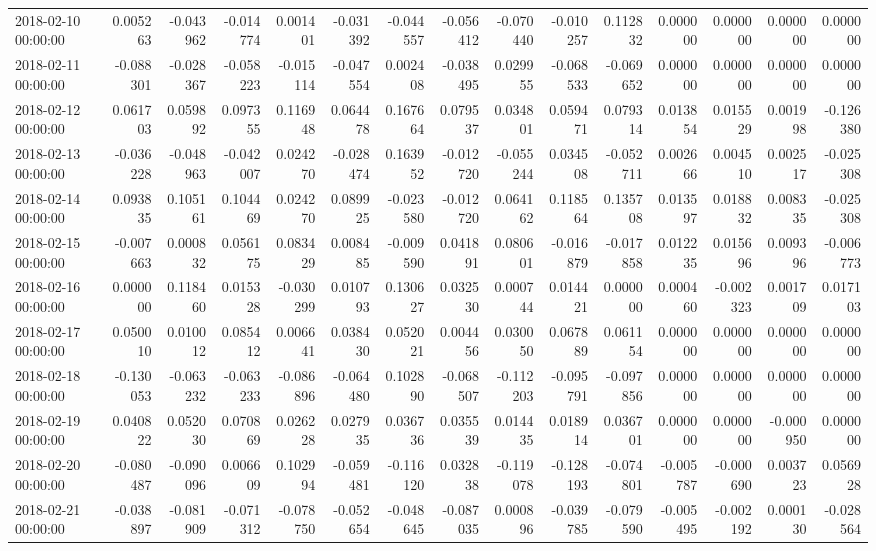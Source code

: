 \begin{tabular}{lrrrrrrrrrrrrrr}
2018-02-10 00:00:00 & 0.005263 & -0.043962 & -0.014774 & 0.001401 & -0.031392 & -0.044557 & -0.056412 & -0.070440 & -0.010257 & 0.112832 & 0.000000 & 0.000000 & 0.000000 & 0.000000 \\
2018-02-11 00:00:00 & -0.088301 & -0.028367 & -0.058223 & -0.015114 & -0.047554 & 0.002408 & -0.038495 & 0.029955 & -0.068533 & -0.069652 & 0.000000 & 0.000000 & 0.000000 & 0.000000 \\
2018-02-12 00:00:00 & 0.061703 & 0.059892 & 0.097355 & 0.116948 & 0.064478 & 0.167664 & 0.079537 & 0.034801 & 0.059471 & 0.079314 & 0.013854 & 0.015529 & 0.001998 & -0.126380 \\
2018-02-13 00:00:00 & -0.036228 & -0.048963 & -0.042007 & 0.024270 & -0.028474 & 0.163952 & -0.012720 & -0.055244 & 0.034508 & -0.052711 & 0.002666 & 0.004510 & 0.002517 & -0.025308 \\
2018-02-14 00:00:00 & 0.093835 & 0.105161 & 0.104469 & 0.024270 & 0.089925 & -0.023580 & -0.012720 & 0.064162 & 0.118564 & 0.135708 & 0.013597 & 0.018832 & 0.008335 & -0.025308 \\
2018-02-15 00:00:00 & -0.007663 & 0.000832 & 0.056175 & 0.083429 & 0.008485 & -0.009590 & 0.041891 & 0.080601 & -0.016879 & -0.017858 & 0.012235 & 0.015696 & 0.009396 & -0.006773 \\
2018-02-16 00:00:00 & 0.000000 & 0.118460 & 0.015328 & -0.030299 & 0.010793 & 0.130627 & 0.032530 & 0.000744 & 0.014421 & 0.000000 & 0.000460 & -0.002323 & 0.001709 & 0.017103 \\
2018-02-17 00:00:00 & 0.050010 & 0.010012 & 0.085412 & 0.006641 & 0.038430 & 0.052021 & 0.004456 & 0.030050 & 0.067889 & 0.061154 & 0.000000 & 0.000000 & 0.000000 & 0.000000 \\
2018-02-18 00:00:00 & -0.130053 & -0.063232 & -0.063233 & -0.086896 & -0.064480 & 0.102890 & -0.068507 & -0.112203 & -0.095791 & -0.097856 & 0.000000 & 0.000000 & 0.000000 & 0.000000 \\
2018-02-19 00:00:00 & 0.040822 & 0.052030 & 0.070869 & 0.026228 & 0.027935 & 0.036736 & 0.035539 & 0.014435 & 0.018914 & 0.036701 & 0.000000 & 0.000000 & -0.000950 & 0.000000 \\
2018-02-20 00:00:00 & -0.080487 & -0.090096 & 0.006609 & 0.102994 & -0.059481 & -0.116120 & 0.032838 & -0.119078 & -0.128193 & -0.074801 & -0.005787 & -0.000690 & 0.003723 & 0.056928 \\
2018-02-21 00:00:00 & -0.038897 & -0.081909 & -0.071312 & -0.078750 & -0.052654 & -0.048645 & -0.087035 & 0.000896 & -0.039785 & -0.079590 & -0.005495 & -0.002192 & 0.000130 & -0.028564 \\

\end{tabular}

